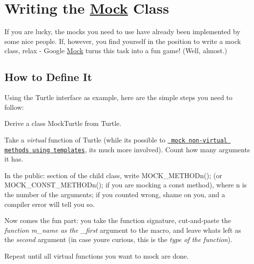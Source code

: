 \section*{Writing the \mbox{\hyperlink{class_mock}{Mock}} Class}

If you are lucky, the mocks you need to use have already been implemented by some nice people. If, however, you find yourself in the position to write a mock class, relax -\/ Google \mbox{\hyperlink{class_mock}{Mock}} turns this task into a fun game! (Well, almost.)

\subsection*{How to Define It}

Using the {\ttfamily Turtle} interface as example, here are the simple steps you need to follow\+:


\begin{DoxyEnumerate}
\item Derive a class {\ttfamily Mock\+Turtle} from {\ttfamily Turtle}.
\end{DoxyEnumerate}
\begin{DoxyEnumerate}
\item Take a {\itshape virtual} function of {\ttfamily Turtle} (while it\textquotesingle{}s possible to \href{CookBook.md\#mocking-nonvirtual-methods}{\texttt{ mock non-\/virtual methods using templates}}, it\textquotesingle{}s much more involved). Count how many arguments it has.
\end{DoxyEnumerate}
\begin{DoxyEnumerate}
\item In the {\ttfamily public\+:} section of the child class, write {\ttfamily M\+O\+C\+K\+\_\+\+M\+E\+T\+H\+O\+Dn();} (or {\ttfamily M\+O\+C\+K\+\_\+\+C\+O\+N\+S\+T\+\_\+\+M\+E\+T\+H\+O\+Dn();} if you are mocking a {\ttfamily const} method), where {\ttfamily n} is the number of the arguments; if you counted wrong, shame on you, and a compiler error will tell you so.
\end{DoxyEnumerate}
\begin{DoxyEnumerate}
\item Now comes the fun part\+: you take the function signature, cut-\/and-\/paste the {\itshape function m\+\_\+name as the \+\_\+first} argument to the macro, and leave what\textquotesingle{}s left as the {\itshape second} argument (in case you\textquotesingle{}re curious, this is the {\itshape type of the function}).
\end{DoxyEnumerate}
\begin{DoxyEnumerate}
\item Repeat until all virtual functions you want to mock are done.
\end{DoxyEnumerate}

